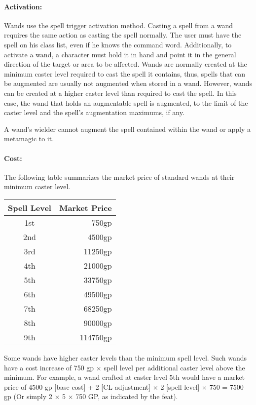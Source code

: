 \paragraph{Activation:} Wands use the spell trigger activation method. Casting a spell from a wand requires the same action as casting the spell normally. 
The user must have the spell on his class list, even if he knows the command word. 
Additionally, to activate a wand, a character must hold it in hand and point it in the general direction of the target or area to be affected.
Wands are normally created at the minimum caster level required to cast the spell it contains, thus, spells that can be augmented are usually not augmented when stored in a wand. 
However, wands can be created at a higher caster level than required to cast the spell. 
In this case, the wand that holds an augmentable spell is augmented, to the limit of the caster level and the spell's augmentation maximums, if any. 

A wand's wielder cannot augment the spell contained within the wand or apply a metamagic to it.

\paragraph{Cost:} The following table summarizes the market price of standard wands at their minimum caster level.
\begin{center}
\begin{tabular}{|c|r|}
\hline
\textbf{Spell Level}&\textbf{Market Price}\\
\hline
1st&750gp\\
2nd&4500gp\\
3rd&11250gp\\
4th&21000gp\\
5th&33750gp\\
6th&49500gp\\
7th&68250gp\\
8th&90000gp\\
9th&114750gp\\
\hline
\end{tabular}
\end{center}
Some wands have higher caster levels than the minimum spell level. Such wands have a cost increase of 750 gp $\times$ spell level per additional caster level above the minimum. For example, a  wand crafted at caster level 5th would have a market price of 4500 gp [base cost] + 2 [CL adjustment] $\times$ 2 [spell level] $\times$ 750 = 7500 gp (Or simply 2 $\times$ 5 $\times$ 750 GP, as indicated by the  feat).

